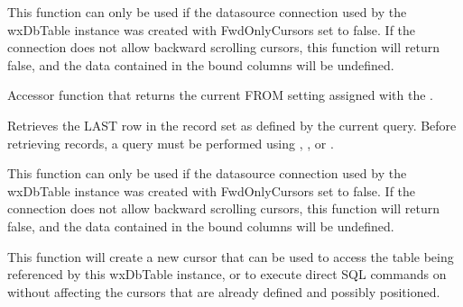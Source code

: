 
This function can only be used if the datasource connection used by the
wxDbTable instance was created with FwdOnlyCursors set to false.  If the
connection does not allow backward scrolling cursors, this function will
return false, and the data contained in the bound columns will be undefined.



\label{wxdbtablegetfromclause}


Accessor function that returns the current FROM setting assigned with the
.



\label{wxdbtablegetlast}


Retrieves the LAST row in the record set as defined by the current query.
Before retrieving records, a query must be performed using
,
,
 or
.


This function can only be used if the datasource connection used by the
wxDbTable instance was created with FwdOnlyCursors set to false.  If the
connection does not allow backward scrolling cursors, this function will
return false, and the data contained in the bound columns will be undefined.



\label{wxdbtablegetnewcursor}


This function will create a new cursor that can be used to access the table
being referenced by this wxDbTable instance, or to execute direct SQL commands
on without affecting the cursors that are already defined and possibly
positioned.

